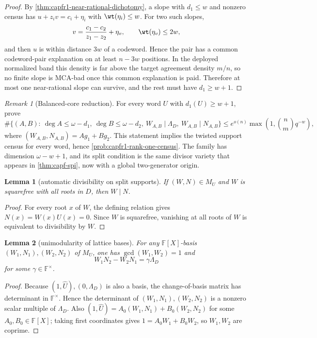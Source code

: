 \documentclass[11pt]{article}
\newtheorem{lemma}[lemma]{Lemma}
\theoremstyle{definition}
\theoremstyle{remark}
\newtheorem{remark}[remark]{Remark}
\newcommand{\F}{\mathbb{F}}
\begin{document}
\begin{proof}
By \cref{thm:capfr1-near-rational-dichotomy}, a slope with \(d_1\le w\) and nonzero census has \(u+z_iv=c_i+\eta_i\) with \(\wt(\eta_i)\le w\).  For two such slopes,
\[
        v={c_1-c_2\over z_1-z_2}+\eta_v,
        \qquad \wt(\eta_v)\le2w,
\]
and then \(u\) is within distance \(3w\) of a codeword.  Hence the pair has a common codeword-pair explanation on at least \(n-3w\) positions.  In the deployed normalized band this density is far above the target agreement density \(m/n\), so no finite slope is MCA-bad once this common explanation is paid.  Therefore at most one near-rational slope can survive, and the rest must have \(d_1\ge w+1\).
\end{proof}

\begin{remark}[Balanced-core reduction]\label{prob:capfr1-balanced-core}
For every word \(U\) with \(d_1(U)\ge w+1\), prove
\[
        \#\{(A,B):\ \deg A\le\omega-d_1,\ \deg B\le\omega-d_2,
        \ W_{A,B}\mid\Lambda_D,
        \ W_{A,B}\mid N_{A,B}\}
        \le
        e^{o(n)}\max\left(1,\binom n m q^{-w}\right),
\]
where \((W_{A,B},N_{A,B})=Ag_1+Bg_2\).  This statement implies the twisted support census for every word, hence \cref{prob:capfr1-rank-one-census}.  The family has dimension \(\omega-w+1\), and its split condition is the same divisor variety that appears in \cref{thm:capf-spi}, now with a global two-generator origin.
\end{remark}

\begin{lemma}[automatic divisibility on split supports]\label{lem:capfr1-autodiv}
If \((W,N)\in M_U\) and \(W\) is squarefree with all roots in \(D\), then \(W\mid N\).
\end{lemma}

\begin{proof}
For every root \(x\) of \(W\), the defining relation gives \(N(x)=W(x)U(x)=0\).  Since \(W\) is squarefree, vanishing at all roots of \(W\) is equivalent to divisibility by \(W\).
\end{proof}

\begin{lemma}[unimodularity of lattice bases]\label{lem:capfr1-unimodular}
For any \(\F[X]\)-basis \((W_1,N_1),(W_2,N_2)\) of \(M_U\), one has \(\gcd(W_1,W_2)=1\) and
\[
        W_1N_2-W_2N_1=\gamma\Lambda_D
\]
for some \(\gamma\in\F^\times\).
\end{lemma}

\begin{proof}
Because \((1,\widehat U),(0,\Lambda_D)\) is also a basis, the change-of-basis matrix has determinant in \(\F^\times\).  Hence the determinant of \((W_1,N_1),(W_2,N_2)\) is a nonzero scalar multiple of \(\Lambda_D\).  Also \((1,\widehat U)=A_0(W_1,N_1)+B_0(W_2,N_2)\) for some \(A_0,B_0\in\F[X]\); taking first coordinates gives \(1=A_0W_1+B_0W_2\), so \(W_1,W_2\) are coprime.
\end{proof}
\end{document}
